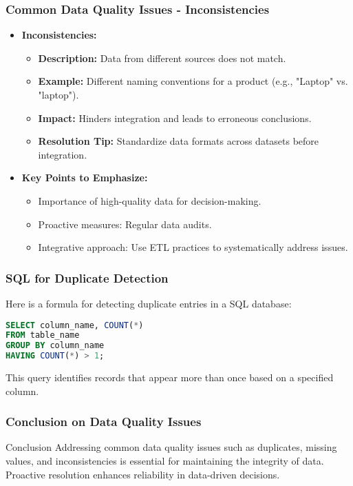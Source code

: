 \documentclass[aspectratio=169]{beamer}
\begin{document}
\begin{frame}[fragile]
    \frametitle{Common Data Quality Issues - Inconsistencies}
    \begin{itemize}
        \item \textbf{Inconsistencies:}
        \begin{itemize}
            \item \textbf{Description:} Data from different sources does not match.
            \item \textbf{Example:} Different naming conventions for a product (e.g., "Laptop" vs. "laptop").
            \item \textbf{Impact:} Hinders integration and leads to erroneous conclusions.
            \item \textbf{Resolution Tip:} Standardize data formats across datasets before integration.
        \end{itemize}
    
        \item \textbf{Key Points to Emphasize:}
        \begin{itemize}
            \item Importance of high-quality data for decision-making.
            \item Proactive measures: Regular data audits.
            \item Integrative approach: Use ETL practices to systematically address issues.
        \end{itemize}
    \end{itemize}
\end{frame}

\begin{frame}[fragile]
    \frametitle{SQL for Duplicate Detection}
    Here is a formula for detecting duplicate entries in a SQL database:
    \begin{lstlisting}[language=SQL]
SELECT column_name, COUNT(*)
FROM table_name
GROUP BY column_name
HAVING COUNT(*) > 1;
    \end{lstlisting}
    This query identifies records that appear more than once based on a specified column.
\end{frame}

\begin{frame}[fragile]
    \frametitle{Conclusion on Data Quality Issues}
    \begin{block}{Conclusion}
        Addressing common data quality issues such as duplicates, missing values, and inconsistencies 
        is essential for maintaining the integrity of data. Proactive resolution enhances reliability 
        in data-driven decisions.
    \end{block}
\end{frame}
\end{document}
